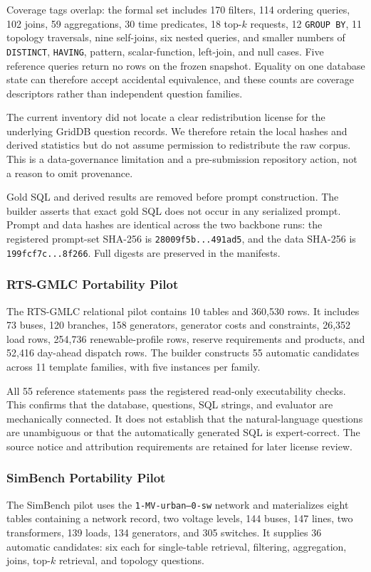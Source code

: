 \documentclass[applsci,article,submit,moreauthors]{Definitions/mdpi}
\begin{document}
Coverage tags overlap: the formal set includes 170 filters, 114 ordering queries, 102 joins, 59 aggregations, 30 time predicates, 18 top-$k$ requests, 12 \texttt{GROUP BY}, 11 topology traversals, nine self-joins, six nested queries, and smaller numbers of \texttt{DISTINCT}, \texttt{HAVING}, pattern, scalar-function, left-join, and null cases. Five reference queries return no rows on the frozen snapshot. Equality on one database state can therefore accept accidental equivalence, and these counts are coverage descriptors rather than independent question families.

The current inventory did not locate a clear redistribution license for the underlying GridDB question records. We therefore retain the local hashes and derived statistics but do not assume permission to redistribute the raw corpus. This is a data-governance limitation and a pre-submission repository action, not a reason to omit provenance.

Gold SQL and derived results are removed before prompt construction. The builder asserts that exact gold SQL does not occur in any serialized prompt. Prompt and data hashes are identical across the two backbone runs: the registered prompt-set SHA-256 is \texttt{28009f5b...491ad5}, and the data SHA-256 is \texttt{199fcf7c...8f266}. Full digests are preserved in the manifests.

\subsubsection{RTS-GMLC Portability Pilot}
The RTS-GMLC relational pilot contains 10 tables and 360,530 rows. It includes 73 buses, 120 branches, 158 generators, generator costs and constraints, 26,352 load rows, 254,736 renewable-profile rows, reserve requirements and products, and 52,416 day-ahead dispatch rows. The builder constructs 55 automatic candidates across 11 template families, with five instances per family.

All 55 reference statements pass the registered read-only executability checks. This confirms that the database, questions, SQL strings, and evaluator are mechanically connected. It does not establish that the natural-language questions are unambiguous or that the automatically generated SQL is expert-correct. The source notice and attribution requirements are retained for later license review.

\subsubsection{SimBench Portability Pilot}
The SimBench pilot uses the \texttt{1-MV-urban--0-sw} network and materializes eight tables containing a network record, two voltage levels, 144 buses, 147 lines, two transformers, 139 loads, 134 generators, and 305 switches. It supplies 36 automatic candidates: six each for single-table retrieval, filtering, aggregation, joins, top-$k$ retrieval, and topology questions.
\end{document}
